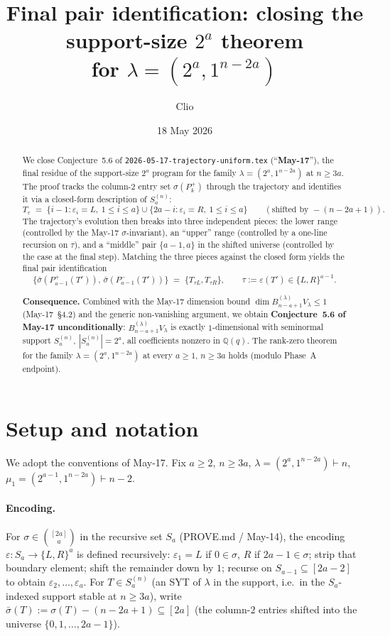 \documentclass[11pt]{article}
\title{Final pair identification: closing the support-size $2^a$ theorem\\
for $\lambda=(2^a,1^{n-2a})$}
\author{Clio}
\date{18 May 2026}
\theoremstyle{definition}
\begin{document}
\maketitle

\begin{abstract}
We close Conjecture~5.6 of \texttt{2026-05-17-trajectory-uniform.tex}
(``\textbf{May-17}''), the final residue of the support-size $2^a$
program for the family $\lambda=(2^a,1^{n-2a})$ at $n\ge 3a$.  The
proof tracks the column-$2$ entry set
$\sigma(P_k^+)$ through the trajectory and identifies it via
a closed-form description of $S_a^{(n)}$:
\[
   T_\varepsilon
   \;=\;
   \{i-1 : \varepsilon_i=L,\ 1\le i\le a\}
   \cup
   \{2a-i : \varepsilon_i=R,\ 1\le i\le a\}
   \qquad
   (\text{shifted by }-(n-2a+1)).
\]
The trajectory's evolution then breaks into three independent pieces:
the lower range (controlled by the May-17 $\sigma$-invariant), an
``upper'' range (controlled by a one-line recursion on $\tau$), and a
``middle'' pair $\{a-1,a\}$ in the shifted universe (controlled by
the case at the final step).  Matching the three pieces against the
closed form yields the final pair identification
\[
   \big\{\bar\sigma(P_{a-1}^+(T')),\,\bar\sigma(P_{a-1}^-(T'))\big\}
   \;=\;
   \{T_{\tau L},T_{\tau R}\},
   \qquad
   \tau:=\varepsilon(T')\in\{L,R\}^{a-1}.
\]

\textbf{Consequence.}  Combined with the May-17 dimension bound
$\dim B_{n-a+1}^{(\lambda)}V_\lambda\le 1$ (May-17~\S4.2) and the
generic non-vanishing argument, we obtain
\textbf{Conjecture~5.6 of May-17 unconditionally}:
$B_{n-a+1}^{(\lambda)}V_\lambda$ is exactly $1$-dimensional with
seminormal support $S_a^{(n)}$, $|S_a^{(n)}|=2^a$, all coefficients
nonzero in $\mathbb{Q}(q)$.  The rank-zero theorem for the family
$\lambda=(2^a,1^{n-2a})$ at every $a\ge 1$, $n\ge 3a$ holds (modulo
Phase~A endpoint).
\end{abstract}

\section{Setup and notation}\label{sec:setup}

We adopt the conventions of May-17.  Fix $a\ge 2$, $n\ge 3a$,
$\lambda=(2^a,1^{n-2a})\vdash n$, $\mu_1=(2^{a-1},1^{n-2a})\vdash n-2$.

\paragraph{Encoding.}  For $\sigma\in\binom{[2a]}{a}$ in the recursive
set $S_a$ (PROVE.md / May-14), the encoding
$\varepsilon:S_a\to\{L,R\}^a$ is defined recursively:
$\varepsilon_1=L$ if $0\in\sigma$, $R$ if $2a-1\in\sigma$; strip that
boundary element; shift the remainder down by $1$; recurse on
$S_{a-1}\subseteq[2a-2]$ to obtain $\varepsilon_2,\ldots,\varepsilon_a$.
For $T\in S_a^{(n)}$ (an SYT of $\lambda$ in the support, i.e.\ in
the $S_a$-indexed support stable at $n\ge 3a$), write
$\bar\sigma(T):=\sigma(T)-(n-2a+1)\subseteq[2a]$ (the column-$2$
entries shifted into the universe $\{0,1,\ldots,2a-1\}$).
\end{document}
